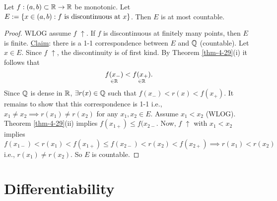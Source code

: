 \documentclass[]{article}
\begin{document}
\begin{theorem}
	Let $f:(a,b)\subset\mathbb{R}\rightarrow\mathbb{R}$ be monotonic.
	Let $E:=\left\{ x\in(a,b) : f\text{ is discontinuous at }x \right\}$.
	Then $E$ is at most countable.
\end{theorem}
\begin{proof}
	WLOG assume $f$ $\uparrow$. If $f$ is discontinuous at finitely many points, then $E$ is finite.
	\ul{Claim}: there is a 1-1 correspondence between $E$ and $\mathbb{Q}$ (countable).
	Let $x\in E$. Since $f$ $\uparrow$, the discontinuity is of first kind.
	By Theorem \ref{thm-4-29}(i) it follows that $$\underset{\in\mathbb{R}}{f(x_-)} < \underset{\in\mathbb{R}}{f(x_+)}.$$
	Since $\mathbb{Q}$ is dense in $\mathbb{R}$, $\exists r(x)\in\mathbb{Q}$ such that $f(x_-)<r(x)<f(x_+)$.
	It remains to show that this correspondence is 1-1 i.e., $x_1\neq x_2\implies r(x_1)\neq r(x_2)$ for any $x_1,x_2\in E$.
	Assume $x_1<x_2$ (WLOG).
	Theorem \ref{thm-4-29}(ii) implies $f(x_{1+})\leq f(x_{2-}$.
	Now, $f$ $\uparrow$ with $x_1<x_2$ implies $$f(x_{1-})<r(x_1)<f(x_{1+}) \leq f(x_{2-}) < r(x_2) < f(x_{2+}) \implies r(x_1) < r(x_2)$$ i.e., $r(x_1)\neq r(x_2)$.
	So $E$ is countable.
\end{proof}

\section*{Differentiability}
\end{document}

